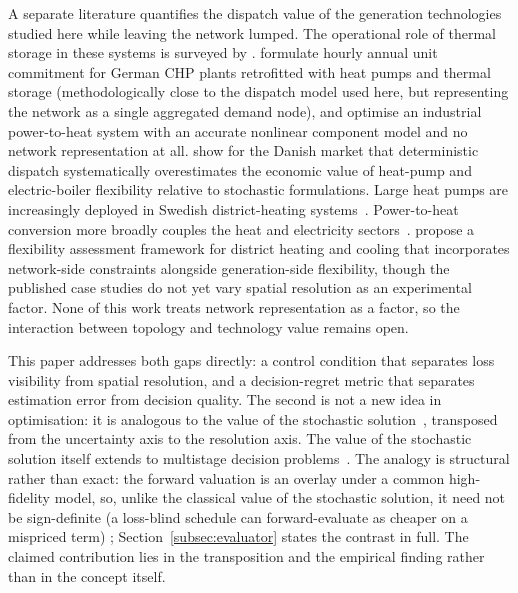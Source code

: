 \documentclass[a4paper,fleqn]{cas-sc}
\providecommand{\DIFadd}[1]{{\protect\color[HTML]{1A5FB4} #1}} %
\providecommand{\DIFaddbegin}{} %
\providecommand{\DIFaddend}{} %
\newcommand{\DIFaddincludegraphics}[2][]{{\color{blue}\fbox{\DIFOincludegraphics[#1]{#2}}}} %
\DeclareRobustCommand{\DIFaddbegin}{\DIFOaddbegin \let\includegraphics\DIFaddincludegraphics} %
\DeclareRobustCommand{\DIFaddend}{\DIFOaddend \let\includegraphics\DIFOincludegraphics} %
\begin{document}
A separate literature quantifies the dispatch value of the generation technologies
studied here while leaving the network lumped. The operational role of thermal storage in
these systems is surveyed by \citet{Guelpa2019review}. \citet{Mollenhauer2018} formulate hourly
annual unit commitment for German CHP plants retrofitted with heat pumps and thermal
storage (methodologically close to the dispatch model used here, but representing the
network as a single aggregated demand node), and \citet{Walden2023} optimise an
industrial power-to-heat system with an accurate nonlinear component model and no network
representation at all. \citet{Nielsen2016} show for the Danish market that deterministic
dispatch systematically overestimates the economic value of heat-pump and electric-boiler
flexibility relative to stochastic formulations. Large heat pumps are increasingly deployed
in Swedish district-heating systems~\citep{Averfalk2017}. Power-to-heat conversion more
broadly couples the heat and electricity sectors~\citep{Schweiger2017_p2h}. \citet{Riedl2026} propose a flexibility
assessment framework for district heating and cooling that incorporates network-side
constraints alongside generation-side flexibility, though the published case studies do
not yet vary spatial resolution as an experimental factor. None of this work treats
network representation as a factor, so the interaction between topology and technology
value remains open.

This paper addresses both gaps directly: a control condition that separates loss
visibility from spatial resolution, and a decision-regret metric that separates
estimation error from decision quality. The second is not a new idea in optimisation:
it is analogous to the value of the stochastic solution~\citep{BirgeLouveaux2011}, transposed
from the uncertainty axis to the resolution axis. The value of the stochastic solution itself
extends to multistage decision problems~\citep{Escudero2007VSS}. The analogy is structural rather than exact:
the forward valuation is an overlay under a common high-fidelity model, so, unlike the classical
value of the stochastic solution, it need not be sign-definite (a loss-blind schedule can
forward-evaluate as cheaper on a mispriced term)\DIFaddbegin \DIFadd{; Section~\ref{subsec:evaluator} states the
contrast in full}\DIFaddend . The claimed contribution lies in the
transposition and the empirical finding rather than in the concept itself.
\end{document}
